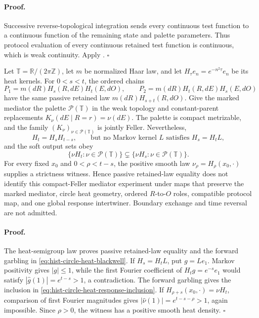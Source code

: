 \paragraph{Proof.}
Successive reverse-topological integration sends every continuous test
function to a continuous function of the remaining state and palette
parameters.  Thus protocol evaluation of every continuous retained test
function is continuous, which is weak continuity.  Apply
.  \(\square\)

Let \(\mathbb T=\mathbb R/(2\pi\mathbb Z)\), let \(m\) be normalized Haar
law, and let \(H_\tau e_n=e^{-n^2\tau}e_n\) be its heat kernels.  For
\(0<s<t\), the ordered chains
\begin{equation}
P_1=m(dR)H_s(R,dE)H_t(E,dO),
\qquad
P_2=m(dR)H_t(R,dE)H_s(E,dO)
\label{eq:hist-circle-heat-chains}
\end{equation}
have the same passive retained law
\(m(dR)H_{s+t}(R,dO)\).  Give the marked mediator the palette
\(\mathcal P(\mathbb T)\) in the weak topology and constant-parent
replacements \(K_\nu(dE\mid R=r)=\nu(dE)\).  The palette is compact
metrizable, and the family \((K_\nu)_{\nu\in\mathcal P(\mathbb T)}\) is
jointly Feller.  Nevertheless,
\begin{equation}
H_t=H_sH_{t-s},
\qquad
\text{but no Markov kernel }L\text{ satisfies }H_s=H_tL,
\label{eq:hist-circle-heat-blackwell}
\end{equation}
and the soft output sets obey
\begin{equation}
\{\nu H_t:\nu\in\mathcal P(\mathbb T)\}
\subsetneq
\{\nu H_s:\nu\in\mathcal P(\mathbb T)\}.
\label{eq:hist-circle-heat-response-inclusion}
\end{equation}
For every fixed \(x_0\) and \(0<\rho<t-s\), the positive smooth law
\(\nu_\rho=H_\rho(x_0,\mathord\cdot)\) supplies a strictness witness.
Hence passive retained-law equality does not identify this compact-Feller mediator
experiment under maps that preserve the marked mediator, circle heat
geometry, ordered \(R\)-to-\(O\) roles, compatible protocol map, and one
global response intertwiner.  Boundary exchange and time reversal are not
admitted.  

\paragraph{Proof.}
The heat-semigroup law proves passive retained-law equality and the forward garbling in
\eqref{eq:hist-circle-heat-blackwell}.  If \(H_s=H_tL\), put
\(g=Le_1\).  Markov positivity gives \(|g|\leq1\), while the first Fourier
coefficient of \(H_tg=e^{-s}e_1\) would satisfy
\(|\widehat g(1)|=e^{t-s}>1\), a contradiction.  The forward garbling gives
the inclusion in \eqref{eq:hist-circle-heat-response-inclusion}.  If
\(H_{\rho+s}(x_0,\mathord\cdot)=\nu H_t\), comparison of first Fourier
magnitudes gives \(|\widehat\nu(1)|=e^{t-s-\rho}>1\), again impossible.
Since \(\rho>0\), the witness has a positive smooth heat density.  \(\square\)

